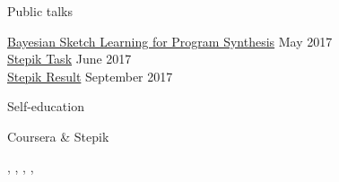 \documentclass{resume} %
\newcommand{\SKIP}{\vspace{-1.5\baselineskip}}
\begin{document}
\begin{rSection}{Public talks}

{\href{https://docs.google.com/presentation/d/1ieE0JZWKbCQH_qpH81M1pSbUSARBP7DKLdGVwk563pM/pub?start=false&loop=false&delayms=3000}{Bayesian Sketch Learning for Program Synthesis}} \hfill May 2017 \\ 
{\href{https://docs.google.com/presentation/d/19FyHBksjffXY6nF1B1xRvkkW-lSp0QIPzU_o-h5RD00/pub?start=false&loop=false&delayms=3000}{Stepik Task}} \hfill June 2017 \\
{\href{https://docs.google.com/presentation/d/e/2PACX-1vSooVyWYFG1swzqGyjLB7dYQ9sLMzzg_s-GqHXBTOw21FyBzhWBtI73wAZlr5lATY5iqEstFBe--Opc/pub?start=false&loop=false&delayms=3000}{Stepik Result}} \hfill September 2017 \\

\end{rSection} 
\SKIP
\begin{rSection}{Self-education}

\begin{rSubsection}{Coursera \& Stepik}{}{}{} 
\item[] , , , , 
\end{rSubsection}

\end{rSection} 
\end{document}
